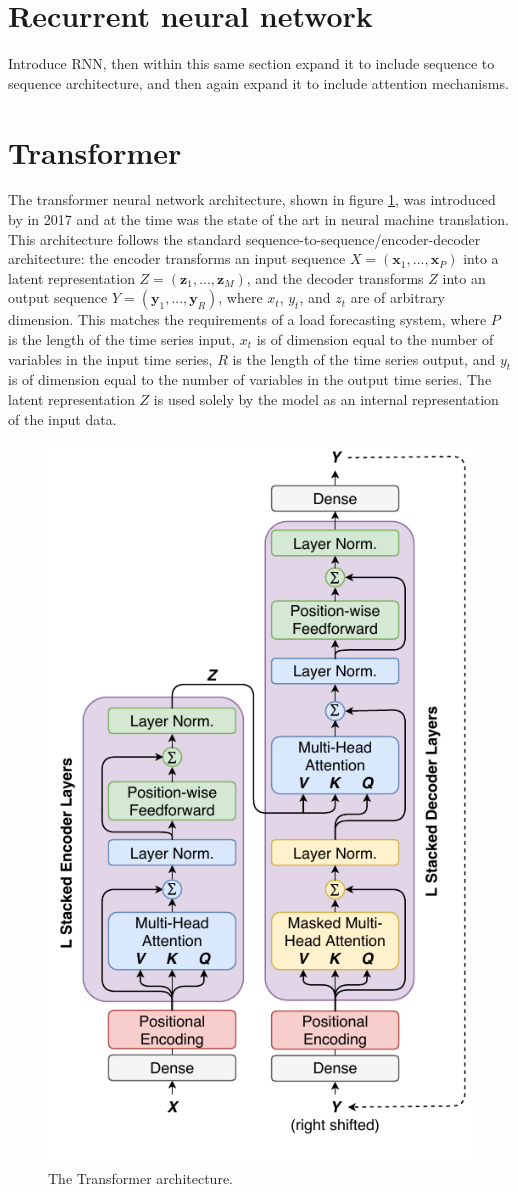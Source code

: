 \section{Recurrent neural network}
Introduce RNN, then within this same section expand it to include sequence to sequence architecture, and then again expand it to include attention mechanisms.

\section{Transformer}
The transformer neural network architecture, shown in figure \ref{fig:transformer}, was introduced by \cite{Vaswani2017} in 2017 and at the time was the state of the art in neural machine translation.
This architecture follows the standard sequence-to-sequence/encoder-decoder architecture: the encoder transforms an input sequence $X = (\boldsymbol{x}_1, ..., \boldsymbol{x}_P)$ into a latent representation $Z = (\boldsymbol{z}_1, ..., \boldsymbol{z}_M)$, and the decoder transforms $Z$ into an output sequence $Y = (\boldsymbol{y}_1, ..., \boldsymbol{y}_R)$, where $x_t$, $y_t$, and $z_t$ are of arbitrary dimension.
This matches the requirements of a load forecasting system, where $P$ is the length of the time series input, $x_t$ is of dimension equal to the number of variables in the input time series, $R$ is the length of the time series output, and $y_t$ is of dimension equal to the number of variables in the output time series.
The latent representation $Z$ is used solely by the model as an internal representation of the input data.

\begin{figure}[htbp]
	\centerline{\includegraphics[trim=0 0.8cm 0 0, width=.35\textwidth]{images/transformer.pdf}}
	\caption{The Transformer architecture.}
	\label{fig:transformer}
\end{figure}

